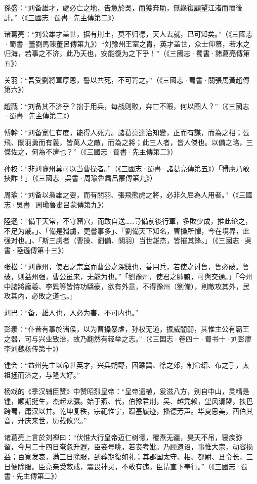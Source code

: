 孫盛：“刘备雄才，處必亡之地，告急於吳，而獲奔助，無緣復顧望江渚而懷後計。”（《三國志·蜀書·先主傳第二》）

诸葛亮：“刘公雄才盖世，据有荆土，莫不归德，天人去就，已可知矣。”（《三國志·蜀書·董劉馬陳董呂傳第九》）“刘豫州王室之胄，英才盖世，众士仰慕，若水之归海，若事之不济，此乃天也，安能復为之下乎！”（《三國志·蜀書·諸葛亮傳第五》）

关羽：“吾受劉將軍厚恩，誓以共死，不可背之。”（《三國志·蜀書·關張馬黃趙傳第六》）

趙戩：“刘备其不济乎？拙于用兵，每战则败，奔亡不暇，何以图人？”（《三國志·蜀書·先主傳第二》）

傅幹：“刘备宽仁有度，能得人死力。諸葛亮達治知變，正而有謀，而為之相；張飛、關羽勇而有義，皆萬人之敵，而為之將；此三人者，皆人傑也。以備之略，三傑佐之，何為不濟也？”（《三國志·蜀書·先主傳第二》）

孙权：“非刘豫州莫可以当曹操者。”（《三國志·蜀書·諸葛亮傳第五》）「猾虜乃敢挾詐！」（《三國志·吳書·周瑜魯肅吕蒙傳第九》）

周瑜：“刘备以枭雄之姿，而有關羽、張飛熊虎之將，必非久屈為人用者。”（《三國志·吳書·周瑜魯肅吕蒙傳第九》）

陸遜：「備干天常，不守窟穴，而敢自送……尋備前後行軍，多敗少成，推此论之，不足为戚。」、「備是猾虜，更嘗事多」、「劉備天下知名，曹操所憚，今在境界，此强对也。」、「斯三虏者（曹操、劉備、關羽）当世雄杰，皆摧其锋。」（《三國志·吳書·陸遜傳第十三》）

张松：“刘豫州，使君之宗室而曹公之深雠也，善用兵，若使之讨鲁，鲁必破。鲁破，则益州强，曹公虽来，无能为也。”「劉豫州，使君之肺腑，可與交通。」「今州中諸將龐羲、李異等皆恃功驕豪，欲有外意，不得豫州（劉備），則敵攻其外，民攻其內，必敗之道也。」

刘巴：“备，雄人也，入必为害，不可内也。”

彭羕：“仆昔有事於诸侯，以为曹操暴虐，孙权无道，振威闇弱，其惟主公有霸王之器，可与兴业致治，故乃翻然有轻举之志。”（《三国志·卷四十·蜀书十·刘彭廖李刘魏杨传第十》）

锺会：“益州先主以命世英才，兴兵朔野，困踬冀、徐之郊，制命绍、布之手，太祖拯而济之，与隆大好。”

杨戏的《季汉辅臣赞》中赞昭烈皇帝：“皇帝遗植，爰滋八方，别自中山，灵精是锺，顺期挺生，杰起龙骧。始于燕、代，伯豫君荆，吴、越凭赖，望风请盟，挟巴跨蜀，庸汉以并。乾坤复秩，宗祀惟宁，蹑基履迹，播德芳声。华夏思美，西伯其音，开庆来世，历载攸兴。”

诸葛亮上言於刘禅曰：“伏惟大行皇帝迈仁树德，覆焘无疆，昊天不吊，寝疾弥留，今月二十四日奄忽升遐，臣妾号咷，若丧考妣。乃顾遗诏，事惟大宗，动容损益；百寮发哀，满三日除服，到葬期復如礼；其郡国太守、相、都尉、县令长，三日便除服。臣亮亲受敕戒，震畏神灵，不敢有违。臣请宣下奉行。”（《三國志·蜀書·先主傳第二》）

